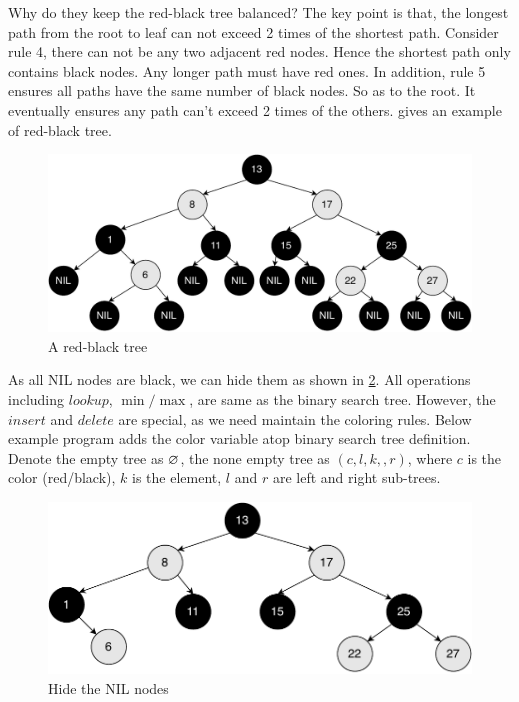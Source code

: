 \documentclass[b5paper]{article}
\begin{document}
Why do they keep the red-black tree balanced? The key point is that, the longest path from the root to leaf can not exceed 2 times of the shortest path. Consider rule 4, there can not be any two adjacent red nodes. Hence the shortest path only contains black nodes. Any longer path must have red ones. In addition, rule 5 ensures all paths have the same number of black nodes. So as to the root. It eventually ensures any path can't exceed 2 times of the others\cite{wiki-rbt}.  gives an example of red-black tree.

\begin{figure}[htbp]
  \centering
  \includegraphics[scale=0.5]{img/rbt-example-with-nil}
  \caption{A red-black tree}
  \label{fig:rbt-example-with-nil}
\end{figure}

As all NIL nodes are black, we can hide them as shown in \cref{fig:rbt-example}. All operations including $lookup$, $\min/\max$, are same as the binary search tree. However, the $insert$ and $delete$ are special, as we need maintain the coloring rules. Below example program adds the color variable atop binary search tree definition. Denote the empty tree as $\varnothing$, the none empty tree as $(c, l, k,, r)$, where $c$ is the color (red/black), $k$ is the element, $l$ and $r$ are left and right sub-trees.

\begin{figure}[htbp]
  \centering
  \includegraphics[scale=0.5]{img/rbt-example}
  \caption{Hide the NIL nodes}
  \label{fig:rbt-example}
\end{figure}
\end{document}
